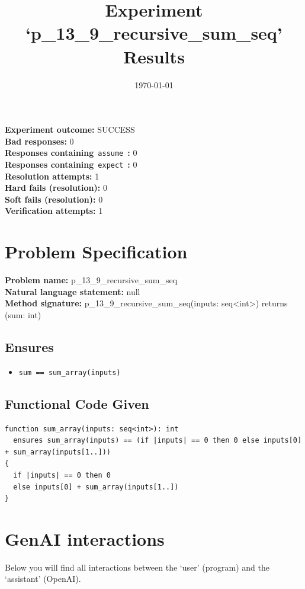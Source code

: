 \documentclass{article}
\begin{document}
\title{Experiment `p\_13\_9\_recursive\_sum\_seq' Results}
\author{\today}
\date{}
\maketitle
\textbf{Experiment outcome: }SUCCESS
\\\textbf{Bad responses: }0
\\\textbf{Responses containing}~\texttt{assume}~\textbf{: }0
\\\textbf{Responses containing}~\texttt{expect}~\textbf{: }0
\\\textbf{Resolution attempts: }1
\\\textbf{Hard fails (resolution): }0
\\\textbf{Soft fails (resolution): }0
\\\textbf{Verification attempts: }1
\section*{Problem Specification}
\textbf{Problem name: }p\_13\_9\_recursive\_sum\_seq
\\\textbf{Natural language statement: }null
\\\textbf{Method signature: }p\_13\_9\_recursive\_sum\_seq(inputs: seq<int>) returns (sum: int)
\subsection*{Ensures}
\begin{itemize}
\item \texttt{sum == sum\_array(inputs)}
\end{itemize}
\subsection*{Functional Code Given}
\begin{lstlisting}
function sum_array(inputs: seq<int>): int
  ensures sum_array(inputs) == (if |inputs| == 0 then 0 else inputs[0] + sum_array(inputs[1..]))
{
  if |inputs| == 0 then 0
  else inputs[0] + sum_array(inputs[1..])
}
\end{lstlisting}
\clearpage
\section*{GenAI interactions}
Below you will find all interactions between the `user' (program) and the `assistant' (OpenAI).
\end{document}
